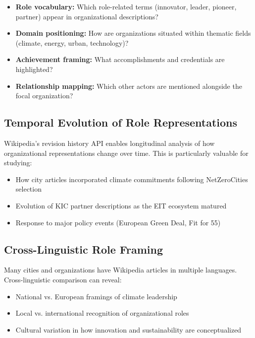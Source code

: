 \begin{kaobox}[frametitle=Content Analysis Opportunities]
\begin{itemize}[leftmargin=*]
    \item \textbf{Role vocabulary:} Which role-related terms (innovator, leader, pioneer, partner) appear in organizational descriptions?
    \item \textbf{Domain positioning:} How are organizations situated within thematic fields (climate, energy, urban, technology)?
    \item \textbf{Achievement framing:} What accomplishments and credentials are highlighted?
    \item \textbf{Relationship mapping:} Which other actors are mentioned alongside the focal organization?
\end{itemize}
\end{kaobox}

\subsection{Temporal Evolution of Role Representations}

Wikipedia's revision history API enables longitudinal analysis of how organizational representations change over time. This is particularly valuable for studying:

\begin{itemize}
    \item How city articles incorporated climate commitments following NetZeroCities selection
    \item Evolution of KIC partner descriptions as the EIT ecosystem matured
    \item Response to major policy events (European Green Deal, Fit for 55)
\end{itemize}

\subsection{Cross-Linguistic Role Framing}

Many cities and organizations have Wikipedia articles in multiple languages. Cross-linguistic comparison can reveal:

\begin{itemize}
    \item National vs. European framings of climate leadership
    \item Local vs. international recognition of organizational roles
    \item Cultural variation in how innovation and sustainability are conceptualized
\end{itemize}


